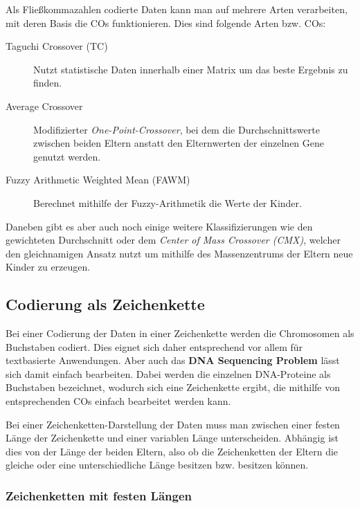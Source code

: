 	Als Fließkommazahlen codierte Daten kann man auf mehrere Arten verarbeiten, mit deren Basis die COs funktionieren. Dies sind \zB folgende Arten bzw. COs:
	
	\begin{description}
		\item[Taguchi Crossover (TC)] Nutzt statistische Daten innerhalb einer Matrix um das beste Ergebnis zu finden. \cite{TaguchiCrossover}
		\item[Average Crossover] Modifizierter \textit{One-Point-Crossover}, bei dem die Durchschnittswerte zwischen beiden Eltern anstatt den Elternwerten der einzelnen Gene genutzt werden. \cite{ConceptOfCOInRealCoded}
		\item[Fuzzy Arithmetic Weighted Mean (FAWM)] Berechnet mithilfe der Fuzzy-Arithmetik die Werte der Kinder. \cite{AirlineRevenueManagement}
	\end{description}
	
	Daneben gibt es aber auch noch einige weitere Klassifizierungen wie \zB den gewichteten Durchschnitt oder dem \textit{Center of Mass Crossover (CMX)}, welcher den gleichnamigen Ansatz nutzt um mithilfe des Massenzentrums der Eltern neue Kinder zu erzeugen. \cite{MultiParentRecombination}

\subsection{Codierung als Zeichenkette}
\label{sec:StrCod}
	
	Bei einer Codierung der Daten in einer Zeichenkette werden die Chromosomen als Buchstaben codiert. Dies eignet sich daher entsprechend vor allem für text\-ba\-sier\-te Anwendungen. Aber auch das \textbf{DNA Sequencing Problem} lässt sich damit einfach bearbeiten. Dabei werden die einzelnen DNA-Proteine als Buchstaben bezeichnet, wodurch sich eine Zeichenkette ergibt, die mithilfe von ent\-sprech\-end\-en COs einfach bearbeitet werden kann. \cite{Survey}
	
	Bei einer Zeichenketten-Darstellung der Daten muss man zwischen einer festen Länge der Zeichenkette und einer variablen Länge unterscheiden. Abhängig ist dies von der Länge der beiden Eltern, also ob die Zeichenketten der Eltern die gleiche oder eine unterschiedliche Länge besitzen bzw. besitzen können.
	
	\subsubsection{Zeichenketten mit festen Längen}
	
